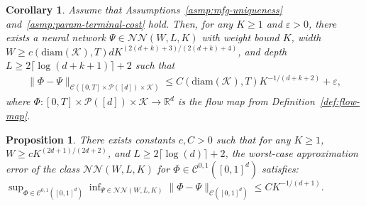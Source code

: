 \documentclass[10pt,a4paper]{amsart}
\newtheorem{proposition}{Proposition}
\newtheorem{corollary}{Corollary}
\newcommand{\NN}{{\mathcal N \mathcal N}}
\newcommand{\R}{\mathbb{R}}
\newcommand{\calC}{{\mathcal C}}
\newcommand{\calK}{{\mathcal K}}
\newcommand{\calP}{{\mathcal P}}
\begin{document}
\begin{corollary}
\label{cor:appx-flow-map}
Assume that Assumptions~\ref{asmp:mfg-uniqueness} and~\ref{asmp:param-terminal-cost} hold. Then, for any $K \geq 1$ and $\varepsilon > 0$, there exists a neural network $\Psi \in \NN(W, L, K)$ with weight bound $K$, width $W \geq c(\mathrm{diam}(\calK), T) d K^{(2(d + k) + 3)/(2(d + k) + 4)}$, and depth $L \geq 2 \lceil \log(d + k + 1)\rceil + 2$ such that
\begin{align*}
    \|\Phi - \Psi\|_{\calC([0, T] \times \calP([d]) \times \calK)} \leq C(\mathrm{diam}(\calK), T) K^{-1/(d + k + 2)} + \varepsilon,
\end{align*}
where $\Phi : [0, T] \times \calP([d]) \times \calK \to \R^d$ is the flow map from Definition~\ref{def:flow-map}.
\end{corollary}

\begin{proposition}
\label{prop:jiao-approx-bound}
There exists constants $c, C > 0$ such that for any $K \geq 1$, $W \geq c K^{(2d+1) / (2d+2)}$, and $L \geq 2 \lceil \log(d)\rceil + 2$, the worst-case approximation error of the class $\NN(W, L, K)$ for $\Phi \in \calC^{0, 1}([0,1]^d)$ satisfies:
$
    \sup_{\Phi \in \calC^{0, 1}([0,1]^d)} \inf_{\Psi \in \NN(W, L, K)} \|\Phi - \Psi\|_{\calC([0,1]^d)} \leq C K^{-1/(d + 1)}.
$
\end{proposition}
\end{document}
